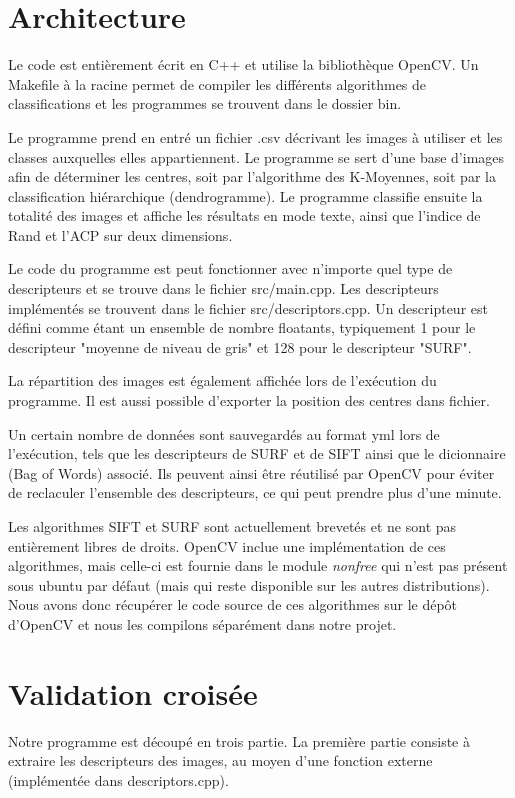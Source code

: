 \documentclass[12pt,a4paper,utf8x]{report}
\begin{document}
\section{Architecture}
    Le code est entièrement écrit en C++ et utilise la bibliothèque OpenCV. Un Makefile à la racine permet de compiler les différents algorithmes de classifications et les programmes se trouvent dans le dossier bin.

    Le programme prend en entré un fichier .csv décrivant les images à utiliser et les classes auxquelles elles appartiennent. Le programme se sert d'une base d'images afin de déterminer les centres, soit par l'algorithme des K-Moyennes, soit par la classification hiérarchique (dendrogramme). Le programme classifie ensuite la totalité des images et affiche les résultats en mode texte, ainsi que l'indice de Rand et l'ACP sur deux dimensions.

    Le code du programme est peut fonctionner avec n'importe quel type de descripteurs et se trouve dans le fichier src/main.cpp. Les descripteurs implémentés se trouvent dans le fichier src/descriptors.cpp. Un descripteur est défini comme étant un ensemble de nombre floatants, typiquement 1 pour le descripteur "moyenne de niveau de gris" et 128 pour le descripteur "SURF".

    La répartition des images est également affichée lors de l'exécution du programme. Il est aussi possible d'exporter la position des centres dans fichier.

    Un certain nombre de données sont sauvegardés au format yml lors de l'exécution, tels que les descripteurs de SURF et de SIFT ainsi que le dicionnaire (Bag of Words) associé. Ils peuvent ainsi être réutilisé par OpenCV pour éviter de reclaculer l'ensemble des descripteurs, ce qui peut prendre plus d'une minute.

    Les algorithmes SIFT et SURF sont actuellement brevetés et ne sont pas entièrement libres de droits. OpenCV inclue une implémentation de ces algorithmes, mais celle-ci est fournie dans le module \textit{nonfree} qui n'est pas présent sous ubuntu par défaut (mais qui reste disponible sur les autres distributions). Nous avons donc récupérer le code source de ces algorithmes sur le dépôt d'OpenCV et nous les compilons séparément dans notre projet.


\section{Validation croisée}
    Notre programme est découpé en trois partie. La première partie consiste à extraire les descripteurs des images, au moyen d'une fonction externe (implémentée dans descriptors.cpp).
\end{document}
